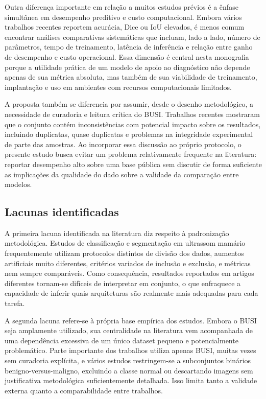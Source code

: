 \documentclass[tcc,capa]{texufpel}
\begin{document}
Outra diferença importante em relação a muitos estudos prévios é a ênfase simultânea em desempenho preditivo e custo computacional. Embora vários trabalhos recentes reportem acurácia, Dice ou IoU elevados, é menos comum encontrar análises comparativas sistemáticas que incluam, lado a lado, número de parâmetros, tempo de treinamento, latência de inferência e relação entre ganho de desempenho e custo operacional. Essa dimensão é central nesta monografia porque a utilidade prática de um modelo de apoio ao diagnóstico não depende apenas de sua métrica absoluta, mas também de sua viabilidade de treinamento, implantação e uso em ambientes com recursos computacionais limitados. \cite{Dan2024,Rayed2024SegSurvey}

A proposta também se diferencia por assumir, desde o desenho metodológico, a necessidade de curadoria e leitura crítica do BUSI. Trabalhos recentes mostraram que o conjunto contém inconsistências com potencial impacto sobre os resultados, incluindo duplicatas, quase duplicatas e problemas na integridade experimental de parte das amostras. Ao incorporar essa discussão ao próprio protocolo, o presente estudo busca evitar um problema relativamente frequente na literatura: reportar desempenho alto sobre uma base pública sem discutir de forma suficiente as implicações da qualidade do dado sobre a validade da comparação entre modelos. \cite{Pawlowska2023,AumenteMaestro2025}

\subsection{Lacunas identificadas}

A primeira lacuna identificada na literatura diz respeito à padronização metodológica. Estudos de classificação e segmentação em ultrassom mamário frequentemente utilizam protocolos distintos de divisão dos dados, aumentos artificiais muito diferentes, critérios variados de inclusão e exclusão, e métricas nem sempre comparáveis. Como consequência, resultados reportados em artigos diferentes tornam-se difíceis de interpretar em conjunto, o que enfraquece a capacidade de inferir quais arquiteturas são realmente mais adequadas para cada tarefa. \cite{Dan2024,Xiao2025UltrasoundSegReview}

A segunda lacuna refere-se à própria base empírica dos estudos. Embora o BUSI seja amplamente utilizado, sua centralidade na literatura vem acompanhada de uma dependência excessiva de um único dataset pequeno e potencialmente problemático. Parte importante dos trabalhos utiliza apenas BUSI, muitas vezes sem curadoria explícita, e vários estudos restringem-se a subconjuntos binários benigno-versus-maligno, excluindo a classe normal ou descartando imagens sem justificativa metodológica suficientemente detalhada. Isso limita tanto a validade externa quanto a comparabilidade entre trabalhos. \cite{AlDhabyani2020,Pawlowska2023,AumenteMaestro2025}
\end{document}
